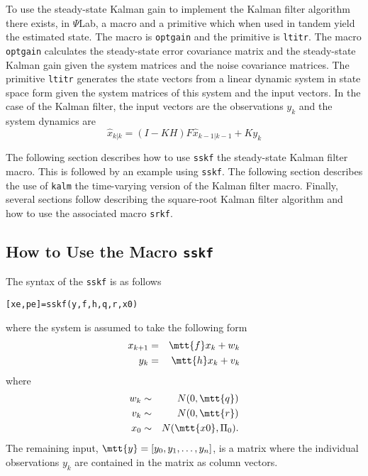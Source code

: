 	To use the steady-state
Kalman gain to implement the Kalman filter algorithm there exists,
in $\Psi$Lab, a macro and a primitive which when 
used in tandem yield the estimated state.
The macro is {\tt optgain} and the primitive is {\tt ltitr}.  The macro
{\tt optgain} calculates the steady-state error covariance matrix
and the steady-state Kalman gain given the system matrices and the
noise covariance matrices.  The primitive {\tt ltitr} generates
the state vectors from a linear dynamic system in state space form
given the system matrices of this system and the input vectors.
In the case of the Kalman filter, the input vectors are the observations
$y_k$ and the system dynamics are
%
\begin{equation}
\hat{x}_{k|k}=(I-KH)F\hat{x}_{k-1|k-1}+Ky_k
\label{e.kf.34a}
\end{equation}
%

	The following section describes how to use {\tt sskf} the steady-state 
Kalman filter macro.  This is followed by an example using {\tt sskf}.
The following section describes the use of {\tt kalm} the time-varying
version of the Kalman filter macro.  Finally, several sections follow
describing the square-root Kalman filter algorithm and how to use the
associated macro {\tt srkf}.

\subsection{How to Use the Macro {\tt sskf}}

	The syntax of the {\tt sskf} is as follows
\begin{verbatim}
[xe,pe]=sskf(y,f,h,q,r,x0)
\end{verbatim}
where the system is assumed to take the following form
%
\begin{eqnarray}
x_{k+1}&=&\mtt{ f}x_k+w_k\nonumber\\
y_k&=&\mtt{ h}x_k+v_k\nonumber
\end{eqnarray}
%
where
%
\begin{eqnarray}
w_k&\sim& N(0,\mtt{ q})\nonumber\\
v_k&\sim& N(0,\mtt{ r})\nonumber\\
x_0&\sim& N(\mtt{ x0},\Pi_0).\nonumber
\end{eqnarray}
%
The remaining input, $\mtt{ y}=[y_0,y_1,\ldots,y_n]$, is a matrix where
the individual observations $y_k$ are contained in the matrix as
column vectors.

